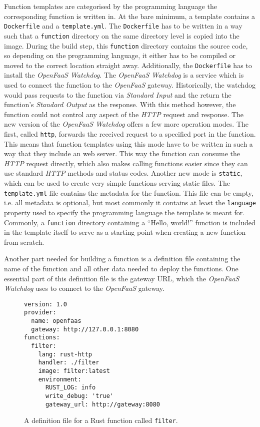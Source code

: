 Function templates are categorised by the programming language the corresponding function is written
in. At the bare minimum, a template contains a \texttt{Dockerfile} and a \texttt{template.yml}. The
\texttt{Dockerfile} has to be written in a way such that a \texttt{function} directory on the same
directory level is copied into the image. During the build step, this \texttt{function} directory
contains the source code, so depending on the programming language, it either has to be compiled or
moved to the correct location straight away. Additionally, the \texttt{Dockerfile} has to install
the \textit{OpenFaaS Watchdog}. The \textit{OpenFaaS Watchdog} is a service which is used to connect
the function to the \textit{OpenFaaS} gateway. Historically, the watchdog would pass requests to the
function via \textit{Standard Input} and the return the function's \textit{Standard Output} as the
response. With this method however, the function could not control any aspect of the \textit{HTTP}
request and response. The new version of the \textit{OpenFaaS Watchdog} offers a few more operation
modes. The first, called \texttt{http}, forwards the received request to a specified port in the
function. This means that function templates using this mode have to be written in such a way that
they include an web server. This way the function can consume the \textit{HTTP} request directly,
which also makes calling functions easier since they can use standard \textit{HTTP} methods and
status codes. Another new mode is \texttt{static}, which can be used to create very simple functions
serving static files. \cite{of-watchdog} The \texttt{template.yml} file contains the metadata for
the function. This file can be empty, i.e. all metadata is optional, but most commonly it contains
at least the \texttt{language} property used to specify the programming language the template is
meant for. \cite{openfaas-build-functions} Commonly, a \texttt{function} directory containing a
“Hello, world!” function is included in the template itself to serve as a starting point when
creating a new function from scratch.

Another part needed for building a function is a definition file containing the name of the function
and all other data needed to deploy the functions. One essential part of this definition file is the
gateway URL, which the \textit{OpenFaaS Watchdog} uses to connect to the \textit{OpenFaaS} gateway.

\begin{figure}[H]
  \begin{lstlisting}
version: 1.0
provider:
  name: openfaas
  gateway: http://127.0.0.1:8080
functions:
  filter:
    lang: rust-http
    handler: ./filter
    image: filter:latest
    environment:
      RUST_LOG: info
      write_debug: 'true'
      gateway_url: http://gateway:8080
  \end{lstlisting}
  \caption{A definition file for a Rust function called \texttt{filter}.}
  \label{fig:function-definition}
\end{figure}

